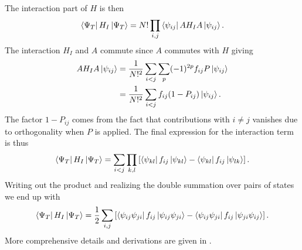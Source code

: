         The interaction part of $H$ is then
            \begin{equation}
                \bra{\Psi_T}H_I\ket{\Psi_T} = N!\prod_{i,j}\bra{\psi_{ij}}AH_IA\ket{\psi_{ij}}.
            \end{equation}
        The interaction $H_I$ and $A$ commute since $A$ commutes with $H$
        giving
            \begin{align}
                AH_IA\ket{\psi_{ij}} &= \frac{1}{N!^2}\sum_{i<j}\sum_{p}
                (-1)^{2p}f_{ij} P\ket{\psi_{ij}} \\
                &= \frac{1}{N!^2}\sum_{i<j}f_{ij}(1-P_{ij})\ket{\psi_{ij}}.
            \end{align}
        The factor $1-P_{ij}$ comes from the fact that contributions with
        $i\neq j$ vanishes due to orthogonality when $P$ is applied. The final
        expression for the interaction term is thus
            \begin{equation}
                \bra{\Psi_T}H_I\ket{\Psi_T} =
                \sum_{i<j}\prod_{k,l}\left[\bra{\psi_{kl}}f_{ij}\ket{\psi_{kl}} -
                \bra{\psi_{kl}}f_{ij}\ket{\psi_{lk}}\right].
            \end{equation}
        Writing out the product and realizing the double summation over pairs
        of states we end up with
            \begin{equation}
                \bra{\Psi_T}H_I\ket{\Psi_T} = \frac{1}{2}
                \sum_{i,j}\left[\bra{\psi_{ij}\psi_{ji}}f_{ij}\ket{\psi_{ij}\psi_{ji}} -
                \bra{\psi_{ij}\psi_{ji}}f_{ij}\ket{\psi_{ji}\psi_{ij}}\right].
            \end{equation}
        More comprehensive details and derivations are given in
        \cite{compphysThijssen,basicMB}.


